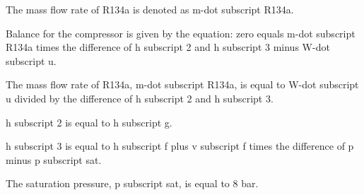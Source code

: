 The mass flow rate of R134a is denoted as m-dot subscript R134a.

Balance for the compressor is given by the equation: zero equals m-dot subscript R134a times the difference of h subscript 2 and h subscript 3 minus W-dot subscript u.

The mass flow rate of R134a, m-dot subscript R134a, is equal to W-dot subscript u divided by the difference of h subscript 2 and h subscript 3.

h subscript 2 is equal to h subscript g.

h subscript 3 is equal to h subscript f plus v subscript f times the difference of p minus p subscript sat.

The saturation pressure, p subscript sat, is equal to 8 bar.